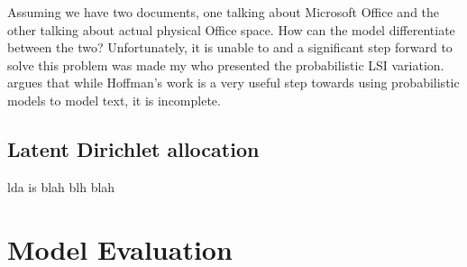 Assuming we have two documents, one talking about Microsoft Office and the other talking about
actual physical Office space. How can the model differentiate between the two? Unfortunately, it is
unable to and a significant step forward to solve this problem was made my
\cite{hofmann1999probabilistic} who presented the probabilistic LSI variation. \cite{blei2003latent}
argues that while Hoffman's work is a very useful step towards using probabilistic models to model
text, it is incomplete.

\subsection{Latent Dirichlet allocation}
\label{sub:bg_lda}
lda is blah blh blah


\section{Model Evaluation}
\label{sec:bg_model_evaluation}

